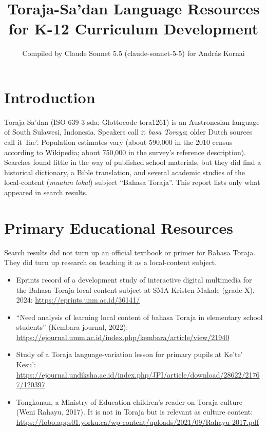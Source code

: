 \documentclass[12pt]{article}
\title{Toraja-Sa'dan Language Resources for K-12 Curriculum Development}
\author{Compiled by Claude Sonnet 5.5 (claude-sonnet-5-5) for Andr\'as Kornai}
\date{}
\begin{document}
\maketitle

\section{Introduction}
Toraja-Sa'dan (ISO 639-3 sda; Glottocode tora1261) is an Austronesian language of South Sulawesi, Indonesia. Speakers call it \emph{basa Toraya}; older Dutch sources call it Tae'. Population estimates vary (about 590,000 in the 2010 census according to Wikipedia; about 750,000 in the survey's reference description). Searches found little in the way of published school materials, but they did find a historical dictionary, a Bible translation, and several academic studies of the local-content (\emph{muatan lokal}) subject ``Bahasa Toraja''. This report lists only what appeared in search results.

\section{Primary Educational Resources}
Search results did not turn up an official textbook or primer for Bahasa Toraja. They did turn up research on teaching it as a local-content subject.
\begin{itemize}
\item Eprints record of a development study of interactive digital multimedia for the Bahasa Toraja local-content subject at SMA Kristen Makale (grade X), 2024: \url{https://eprints.unm.ac.id/36141/}
\item ``Need analysis of learning local content of bahasa Toraja in elementary school students'' (Kembara journal, 2022): \url{https://ejournal.umm.ac.id/index.php/kembara/article/view/21940}
\item Study of a Toraja language-variation lesson for primary pupils at Ke'te' Kesu': \url{https://ejournal.undiksha.ac.id/index.php/JPI/article/download/28622/21767/120397}
\item Tongkonan, a Ministry of Education children's reader on Toraja culture (Weni Rahayu, 2017). It is not in Toraja but is relevant as culture content: \url{https://lobo.apps01.yorku.ca/wp-content/uploads/2021/09/Rahayu-2017.pdf}
\end{itemize}
\end{document}
